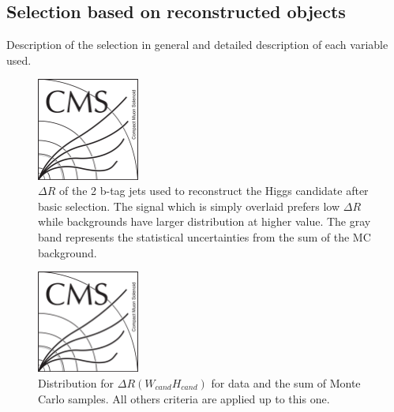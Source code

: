\subsection{Selection based on reconstructed objects}

Description of the selection in general and detailed description of each variable used.

\begin{figure}[!Hhtbp]
  \begin{center}
    \includegraphics[width=0.3\textwidth]{figs/CMSlogo.png}
    \caption{$\Delta R$ of the 2 b-tag jets used to reconstruct the Higgs candidate after basic selection. The signal which is simply overlaid prefers low $\Delta R$ while backgrounds have larger distribution at higher value. The gray band represents the statistical uncertainties from the sum of the MC background.}
    \label{fig:DRbb}
  \end{center}
\end{figure}\clearpage

\begin{figure}[!Hhtbp]
  \begin{center}
    \includegraphics[width=0.3\textwidth]{figs/CMSlogo.png}
    \caption{Distribution for $\Delta R (W_{cand} H_{cand})$ for data and the sum of Monte Carlo samples. All others criteria are applied up to this one.}
    \label{fig:DRWH}
  \end{center}
\end{figure}\clearpage

